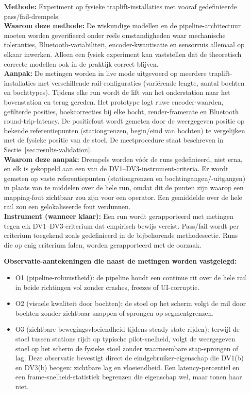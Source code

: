 \documentclass[10pt, a4paper, twocolumn]{article}
\begin{document}
\textbf{Methode:} Experiment op fysieke traplift-installaties met vooraf
gedefinieerde pass/fail-drempels.\\
\textbf{Waarom deze methode:} De wiskundige modellen en de pipeline-architectuur
moeten worden geverifieerd onder reële omstandigheden waar mechanische
toleranties, Bluetooth-variabiliteit, encoder-kwantisatie en sensorruis allemaal
op elkaar inwerken. Alleen een fysiek experiment kan vaststellen dat de
theoretisch correcte modellen ook in de praktijk correct blijven.\\
\textbf{Aanpak:} De metingen worden in live mode uitgevoerd op meerdere
traplift-installaties met verschillende rail-configuraties (variërende lengte,
aantal bochten en bochttypes). Tijdens elke run wordt de lift van het
onderstation naar het bovenstation en terug gereden. Het prototype logt ruwe
encoder-waarden, gefilterde posities, hoekcorrecties bij elke bocht,
render-framerate en Bluetooth round-trip-latency. De positiefout wordt gemeten door
de weergegeven positie op bekende referentiepunten (stationgrenzen, begin/eind
van bochten) te vergelijken met de fysieke positie van de stoel. De
meetprocedure staat beschreven in Sectie~\ref{sec:results-validation}.\\
\textbf{Waarom deze aanpak:} Drempels worden vóór de runs gedefinieerd, niet
erna, en elk is gekoppeld aan een van de DV1--DV3-instrument-criteria. Er wordt gemeten op
vaste referentiepunten (stationgrenzen en bochtingangen/-uitgangen) in plaats
van te middelen over de hele run, omdat dit de punten zijn waarop een
mapping-fout zichtbaar zou zijn voor een operator. Een gemiddelde over de hele
rail zou een gelokaliseerde fout verdunnen.\\
\textbf{Instrument (wanneer klaar):} Een run wordt gerapporteerd met metingen
tegen elk DV1--DV3-criterium dat empirisch bewijs vereist. Pass/fail wordt per
criterium toegekend zoals gedefinieerd in de bijbehorende methodesectie. Runs
die op enig criterium falen, worden gerapporteerd met de oorzaak.

\textbf{Observatie-aantekeningen die naast de metingen worden vastgelegd:}
\begin{itemize}[leftmargin=*]
  \item O1 (pipeline-robuustheid): de pipeline houdt een continue rit over de
    hele rail in beide richtingen vol zonder crashes, freezes of
    UI-corruptie.
  \item O2 (visuele kwaliteit door bochten): de stoel op het scherm volgt de
    rail door bochten zonder zichtbaar snappen of sprongen op
    segmentgrenzen.
  \item O3 (zichtbare bewegingsvloeiendheid tijdens steady-state-rijden):
    terwijl de stoel tussen stations rijdt op typische pilot-snelheid, volgt de
    weergegeven stoel op het scherm de fysieke stoel zonder waarneembare
    stap-sprongen of lag. Deze observatie bevestigt direct de
    eindgebruiker-eigenschap die DV1(b) en DV3(b) beogen: zichtbare lag en
    vloeiendheid. Een latency-percentiel en een frame-snelheid-statistiek
    begrenzen die eigenschap wel, maar tonen haar niet.
\end{itemize}
\end{document}
